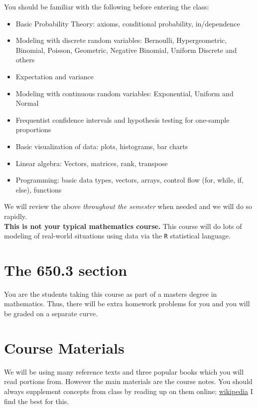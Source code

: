 \documentclass[12pt]{article}
\begin{document}
You should be familiar with the following before entering the class:

\begin{itemize}
\itemsep -0.0em 
\item Basic Probability Theory: axioms, conditional probability, in/dependence
\item Modeling with discrete random variables: Bernoulli, Hypergeometric, Binomial, Poisson, Geometric, Negative Binomial, Uniform Discrete and others
\item Expectation and variance
\item Modeling with continuous random variables: Exponential, Uniform and Normal
\item Frequentist confidence intervals and hypothesis testing for one-sample proportions
\item Basic visualization of data: plots, histograms, bar charts
\item Linear algebra: Vectors, matrices, rank, transpose
\item Programming: basic data types, vectors, arrays, control flow (for, while, if, else), functions
\end{itemize}

\noindent We will review the above \textit{throughout the semester} when needed and we will do so rapidly. \\

\textbf{This is not your typical mathematics course.} This course will do lots of modeling of real-world situations using data via the \texttt{R} statistical language.

\section*{The 650.3 section}

You are the students taking this course as part of a masters degree in mathematics. Thus, there will be extra homework problems for you and you will be graded on a separate curve.

\section*{Course Materials}

We will be using many reference texts and three popular books which you will read portions from. However the main materials are the course notes. You should always supplement concepts from class by reading up on them online; \href{https://en.wikipedia.org}{wikipedia} I find the best for this. 
\end{document}
